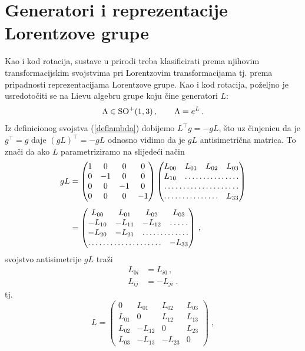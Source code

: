 \section{Generatori i reprezentacije Lorentzove grupe}
\label{sec:genLor}

Kao i kod rotacija, sustave u prirodi treba klasificirati prema
njihovim transformacijskim svojstvima pri Lorentzovim transformacijama
tj. prema pripadnosti reprezentacijama Lorentzove
grupe. Kao i kod rotacija, poželjno je usredotočiti se na Lievu algebru
grupe koju čine generatori $L$:
\begin{equation}
    \Lambda \in \mathrm{SO}^{+}(1,3) \,, \qquad \Lambda = e^L \,.
\end{equation}
Iz definicionog svojstva (\ref{deflambda}) dobijemo $L^\top g = -g L$,
što uz činjenicu da je $g^\top = g$ daje $(gL)^\top = -gL$ odnosno
vidimo da je $gL$ antisimetrična matrica. To znači da ako $L$
parametriziramo na slijedeći način
\begin{align}
 gL &= 
\begin{pmatrix}
1 & 0 & 0 & 0 \\
0 &-1 & 0 & 0 \\
0 & 0 &-1 & 0 \\
0 & 0 & 0 &-1
\end{pmatrix}
\begin{pmatrix}
L_{00} & L_{01} & L_{02} & L_{03}\\
L_{10} &\hdotsfor{3} \\
\hdotsfor{4} \\
\hdotsfor{3} & L_{33}
\end{pmatrix} \\[1ex]
&= 
\begin{pmatrix}
L_{00} & L_{01} & L_{02} & L_{03}\\
-L_{10} & -L_{11} & -L_{12} &\hdotsfor{1} \\
-L_{20} & -L_{21} & \hdotsfor{2} \\
\hdotsfor{3} & -L_{33}
\end{pmatrix} \,,
\end{align}
svojstvo antisimetrije $gL$ traži
\begin{align}
L_{0i} &= L_{i0} \,, \\
L_{ij} &= - L_{ji} \;.
\end{align}
tj.
\begin{equation}
 L = \begin{pmatrix}
0 & L_{01} & L_{02} & L_{03}\\
L_{01} & 0 & L_{12} & L_{13}\\
L_{02} & -L_{12} & 0& L_{23} \\
L_{03} & -L_{13} &-L_{23} & 0
\end{pmatrix} \;,
\end{equation}
